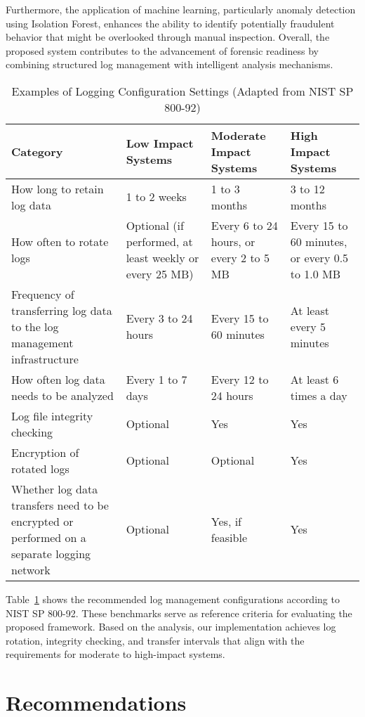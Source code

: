 Furthermore, the application of machine learning, particularly anomaly detection using Isolation Forest, enhances the ability to identify potentially fraudulent behavior that might be overlooked through manual inspection. Overall, the proposed system contributes to the advancement of forensic readiness by combining structured log management with intelligent analysis mechanisms.
\begin{table}[H]
	\centering
	\caption{Examples of Logging Configuration Settings (Adapted from NIST SP 800-92)}
	\begin{tabular}{|p{5.5cm}|p{3cm}|p{3cm}|p{3cm}|}
		\hline
		\textbf{Category} & \textbf{Low Impact Systems} & \textbf{Moderate Impact Systems} & \textbf{High Impact Systems} \\
		\hline
		How long to retain log data & 1 to 2 weeks & 1 to 3 months & 3 to 12 months \\
		\hline
		How often to rotate logs & Optional (if performed, at least weekly or every 25 MB) & Every 6 to 24 hours, or every 2 to 5 MB & Every 15 to 60 minutes, or every 0.5 to 1.0 MB \\
		\hline
		Frequency of transferring log data to the log management infrastructure & Every 3 to 24 hours & Every 15 to 60 minutes & At least every 5 minutes \\
		\hline
		How often log data needs to be analyzed & Every 1 to 7 days & Every 12 to 24 hours & At least 6 times a day \\
		\hline
		Log file integrity checking & Optional & Yes & Yes \\
		\hline
		Encryption of rotated logs & Optional & Optional & Yes \\
		\hline
		Whether log data transfers need to be encrypted or performed on a separate logging network & Optional & Yes, if feasible & Yes \\
		\hline
	\end{tabular}
	\label{tab:logging_config_nist}
\end{table}

Table~\ref{tab:logging_config_nist} shows the recommended log management configurations according to NIST SP 800-92. These benchmarks serve as reference criteria for evaluating the proposed framework. Based on the analysis, our implementation achieves log rotation, integrity checking, and transfer intervals that align with the requirements for moderate to high-impact systems.

\section{Recommendations}

